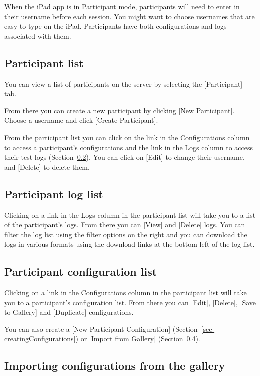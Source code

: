 \documentclass{article}
\begin{document}
When the iPad app is in Participant mode, participants will need to enter in their username before each session. You might want to choose usernames that are easy to type on the iPad. Participants have both configurations and logs associated with them.

\subsection{Participant list}

You can view a list of participants on the server by selecting the [Participant] tab.

From there you can create a new participant by clicking [New
Participant].
Choose a username and click [Create Participant].

From the participant list you can click on the link in the Configurations column 
to access
a participant's configurations and the link in the Logs column to access their test logs
(Section~\ref{sec-logList}).
You can click on [Edit] to change their username, 
and [Delete] to delete them.

\subsection{Participant log list}
\label{sec-logList}

Clicking on a link in the Logs column in the participant list will take
you to a list of the participant's logs.
From there you can [View] and [Delete] logs.
You can filter the log list using the filter options on the right and
you can download the logs in various formats using the download links
at the bottom left of the log list.

\subsection{Participant configuration list}
\label{sec-configList}

Clicking on a link in the Configurations column in the participant list
will take you to a participant's configuration list.
From there you can [Edit], [Delete], [Save to Gallery] and
[Duplicate] configurations.

You can also create a [New Participant Configuration]
(Section~\ref{sec-creatingConfigurations}) or [Import from Gallery]
(Section~\ref{sec-importingFromGallery}).

\subsection{Importing configurations from the gallery}
\label{sec-importingFromGallery}
\end{document}
